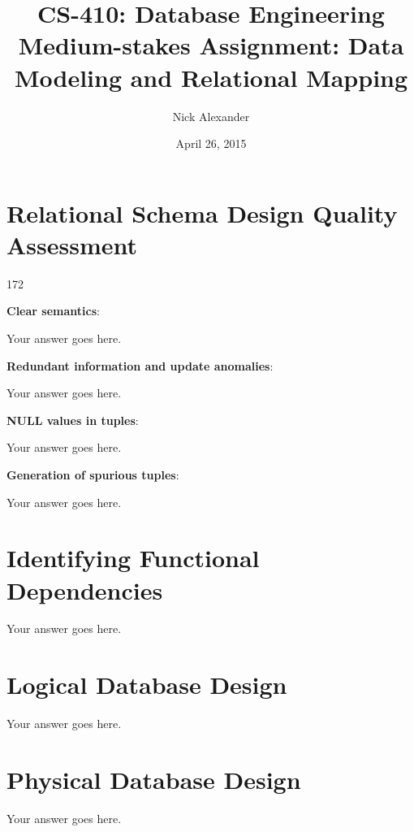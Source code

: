 \documentclass[11pt]{article}
\title{CS-410: Database Engineering \\ Medium-stakes Assignment: Data Modeling and Relational Mapping}
\author{Nick Alexander}
\date{April 26, 2015}
\begin{document}
\maketitle
\thispagestyle{empty}
\tableofcontents
\newpage


\section{Relational Schema Design Quality Assessment} \label{sec:qualitative}


\begin{dingautolist}{172}

\item \textbf{Clear semantics}: 

    Your answer goes here.

\item \textbf{Redundant information and update anomalies}: 

    Your answer goes here.

\item \textbf{NULL values in tuples}: 

    Your answer goes here.

\item \textbf{Generation of spurious tuples}: 

    Your answer goes here.

\end{dingautolist}

\section{Identifying Functional Dependencies} \label{sec:fds}

    Your answer goes here.

\section{Logical Database Design} \label{sec:logical}

    Your answer goes here.

\section{Physical Database Design} \label{sec:physical}

    Your answer goes here.
\end{document}
